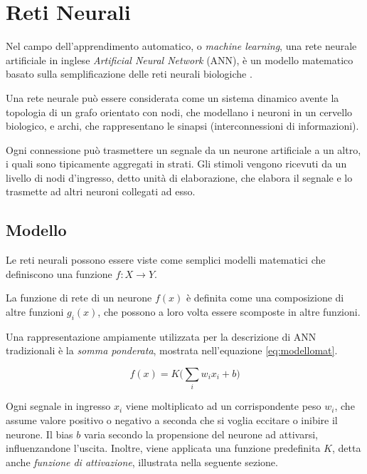 \chapter{Reti Neurali}
\label{chap:RetiNeurali}

Nel campo dell'apprendimento automatico, o \emph{machine learning}, una rete neurale artificiale  in inglese \emph{Artificial Neural Network} (ANN),  è un modello matematico basato sulla semplificazione delle reti neurali biologiche \cite{samuel1959some}.

Una rete neurale può essere considerata come un sistema dinamico avente la topologia di un grafo orientato con nodi, che modellano i neuroni in un cervello biologico, e archi, che rappresentano le sinapsi (interconnessioni di informazioni).

Ogni connessione può trasmettere un segnale da un neurone artificiale a un altro, i quali sono tipicamente aggregati in strati. Gli stimoli vengono ricevuti da un livello di nodi d'ingresso, detto unità di elaborazione, che elabora il segnale e lo trasmette ad altri neuroni collegati ad esso.

\section{Modello}
\label{sec:modello}

Le reti neurali possono essere viste come semplici modelli matematici che definiscono una funzione $f:X\rightarrow Y$. 

La funzione di rete di un neurone $f(x)$ è definita come una composizione di altre funzioni $g_i(x)$, che possono a loro volta essere scomposte in altre funzioni.

Una rappresentazione ampiamente utilizzata per la descrizione di ANN tradizionali è la \emph{somma ponderata}, mostrata nell'equazione \ref{eq:modellomat}.

\begin{equation}
f(x)=K \bigg( \sum_{i}w_ix_i +b\bigg)
\label{eq:modellomat}
\end{equation}

Ogni segnale in ingresso $x_i$ viene moltiplicato ad un corrispondente peso $w_i$, che assume valore positivo o negativo a seconda che si voglia eccitare o inibire il neurone.  
Il bias $b$ varia secondo la propensione del neurone ad attivarsi, influenzandone l'uscita.
Inoltre, viene applicata una funzione predefinita $K$, detta anche \emph{funzione di attivazione}, illustrata nella seguente sezione.

